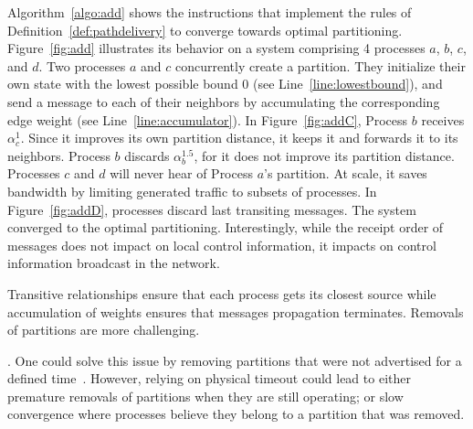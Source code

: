 Algorithm~\ref{algo:add} shows the instructions that implement the
rules of Definition~\ref{def:pathdelivery} to converge towards optimal
partitioning. Figure~\ref{fig:add} illustrates its behavior on a
system comprising 4 processes $a$, $b$, $c$, and $d$. Two processes
$a$ and $c$ concurrently create a partition. They initialize their own
state with the lowest possible bound $0$ (see
Line~\ref{line:lowestbound}), and send a message to each of their
neighbors by accumulating the corresponding edge weight (see
Line~\ref{line:accumulator}). In Figure~\ref{fig:addC}, Process $b$
receives $\alpha_{c}^{1}$. Since it improves its own partition
distance, it keeps it and forwards it to its neighbors. Process $b$
discards $\alpha_{b}^{1.5}$, for it does not improve its partition
distance. Processes $c$ and $d$ will never hear of Process $a$'s
partition. At scale, it saves bandwidth by limiting generated traffic
to subsets of processes. In Figure~\ref{fig:addD}, processes discard
last transiting messages. The system converged to the optimal
partitioning. Interestingly, while the receipt order of messages does
not impact on local control information, it impacts on control
information broadcast in the network. 

Transitive relationships ensure that each process gets its closest
source while accumulation of weights ensures that messages propagation
terminates.  Removals of partitions are more
challenging.

\begin{definition}
\end{definition}
  
 . One could solve this issue by
removing partitions that were not advertised for a defined
time~\REF. However, relying on physical timeout could lead to either
premature removals of partitions when they are still operating; or
slow convergence where processes believe they belong to a partition
that was removed.


